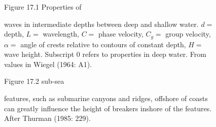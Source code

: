 \begin{figure}[t!]
{}
\footnotesize
Figure 17.1 Properties of \rule{0mm}{3ex}waves in intermediate depths
between deep and shallow water. $d=$ depth, $L=$ wavelength, $C=$
phase velocity, $C_g=$ group velocity, $\alpha = $ angle of crests
relative to contours of constant depth, $H = $ wave height. Subscript
$0$ refers to properties in deep water. From values in Wiegel (1964:
A1).

\label{wiegelgraph}
\vspace{-4ex}
\end{figure}

\begin{figure}[b!]
\vspace{-1ex}
\centering
{}
\footnotesize
Figure 17.2 sub-sea \rule{0mm}{4ex}features, such as submarine canyons
and ridges, offshore of coasts can greatly influence the height of
breakers inshore of the features. After
Thurman (1985: 229).

\label{wavefocusing}
\end{figure}

